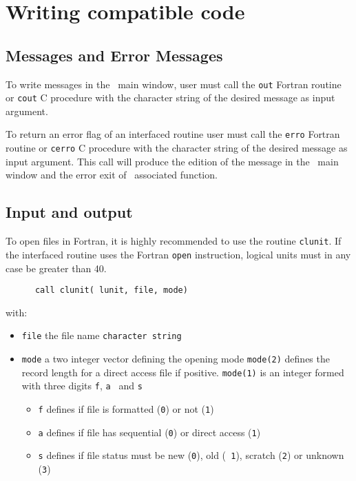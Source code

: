 \documentclass[11pt]{article}
\begin{document}
\section{Writing compatible code}
\label{compat}

\subsection{ Messages and Error Messages}

To write messages in the  \SCI\ main window, user  must call the
{\tt out} Fortran routine or {\tt cout} C procedure with the
character string of the desired message as input argument.

To return an error flag of  an interfaced routine user must call the
{\tt erro} Fortran routine or {\tt cerro} C procedure with the
character string of the desired message as input argument. This call
will produce the edition of the message in the \SCI\ main window and
the error exit of \SCI\ associated function.

\subsection{ Input and output}


To open files in Fortran, it is highly recommended to  use the 
\SCI routine {\tt   clunit}. If the interfaced routine uses the 
Fortran {\tt open}
instruction, logical units must in any case be greater than 40.
\begin{verbatim}
      call clunit( lunit, file, mode)
\end{verbatim}
with:
\begin{itemize}
\item {\tt file} the file name {\tt character string}
\item {\tt mode} a two integer vector defining the opening mode
 {\tt mode(2)} defines the record length for a direct access file if
 positive. 
{\tt mode(1)} is an integer formed with three digits {\tt f}, {\tt a }
and {\tt s}
\begin{itemize}
\item {\tt f} defines if file is formatted ({\tt 0}) or not ({\tt 1})
\item {\tt a} defines if file has sequential ({\tt 0}) or direct
  access ({\tt 1})
\item {\tt s} defines if file status must be new ({\tt 0}), old ({\tt
    1}), scratch ({\tt 2}) or unknown ({\tt 3})
\end{itemize}
\end{itemize}
\end{document}

